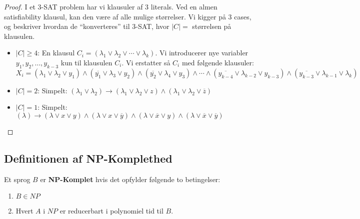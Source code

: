 \begin{proof}
	I et 3-SAT problem har vi klausuler af 3 literals. Ved en almen satisfiability klausul, kan den være af alle mulige størrelser. Vi kigger på 3 cases, og beskriver hvordan de ``konverteres'' til 3-SAT, hvor $|C| =$ størrelsen på klausulen.
	\begin{itemize}
		\item $|C| \ge 4$: En klausul $C_{i} = (\lambda_{1} \lor \lambda_{2} \lor \cdots \lor \lambda_{k})$. Vi introducerer nye variabler $y_{1}, y_{2}, \ldots, y_{k-3}$ kun til klausulen $C_{i}$. Vi erstatter så $C_{i}$ med følgende klausuler:
		      \begin{equation*}
			      X_{i} = (\lambda_{1} \lor \lambda_{2} \lor y_{1}) \land (\overline{y_{1}} \lor \lambda_{3} \lor y_{2}) \land (\overline{y_{2}} \lor \lambda_{4} \lor y_{3}) \land \cdots \land (\overline{y_{k-4}} \lor \lambda_{k-2} \lor y_{k-3}) \land (\overline{y_{k-3}} \lor \lambda_{k-1} \lor \lambda_{k})
		      \end{equation*}


		\item $|C| = 2$: Simpelt: $(\lambda_{1} \lor \lambda_{2}) \rightarrow (\lambda_{1} \lor \lambda_{2} \lor z) \land (\lambda_{1} \lor \lambda_{2} \lor \overline{z})$
		\item $|C| = 1$: Simpelt: $(\lambda) \rightarrow (\lambda \lor x \lor y) \land (\lambda \lor x \lor \overline{y}) \land (\lambda \lor \overline{x} \lor y) \land (\lambda \lor \overline{x} \lor \overline{y})$
	\end{itemize}
\end{proof}


\subsection{Definitionen af NP-Komplethed}%
\label{subsec:definitionofnpcompleteness}

\begin{definition}[NP-Komplethed]
	\label{def:npcomplete}
	Et sprog $B$ er \textbf{NP-Komplet} hvis det opfylder følgende to betingelser:
	\begin{enumerate}
		\item $B \in NP$
		\item Hvert $A$ i $NP$ er reducerbart i polynomiel tid til $B$.
	\end{enumerate}
\end{definition}

